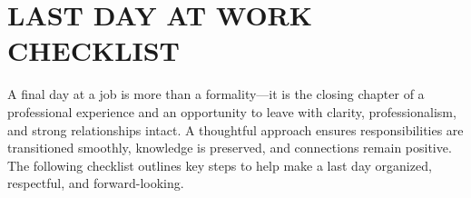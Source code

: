 
\section*{\centering LAST DAY AT WORK CHECKLIST}
\vspace*{0.5cm}

A final day at a job is more than a formality—it is the closing chapter of a professional experience and an opportunity to leave with clarity, professionalism, and strong relationships intact. A thoughtful approach ensures responsibilities are transitioned smoothly, knowledge is preserved, and connections remain positive. The following checklist outlines key steps to help make a last day organized, respectful, and forward-looking.

